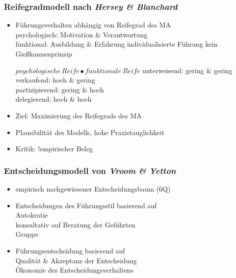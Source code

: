 \documentclass{cheatsheet}
\begin{document}
    \begin{normbox}{\subsubsection{Reifegradmodell nach \emph{Hersey \& Blanchard}}}
        \begin{itemize}
            \item Führungsverhalten abhängig von Reifegrad des MA\\
            \ra psychologisch: Motivation \& Verantwortung\\
            \ra funktional: Ausbildung \& Erfahrung
            \ra individualisierte Führung \ra kein Gießkannenprinzip
            \begin{hintbox}{$psychologische \ Reife \bullet funktionale \ Reife$}
                \ra unterweisend: gering \& gering\\
                \ra verkaufend: hoch \& gering\\
                \ra partizipierend: gering \& hoch\\
                \ra delegierend: hoch \& hoch
            \end{hintbox}
            \item Ziel: Maximierung des Reifegrads des MA
            \item Plausibilität des Modells, hohe Praxistauglichkeit 
            \item Kritik: !empirischer Beleg
        \end{itemize}
    \end{normbox}
    \begin{normbox}{\subsubsection{Entscheidungsmodell von \emph{Vroom \& Yetton}}}
        \begin{itemize}
            \item empirisch nachgewiesener Entscheidungsbaum (6Q)
            \item Entscheidungen des Führungsstil basierend auf\\
            \ra Autokratie\\
            \ra konsultativ auf Beratung der Geführten\\
            \ra Gruppe
            \item Führungsentscheidung basierend auf\\
            \ra Qualität \& Akzeptanz der Entscheidung\\
            \ra Ökonomie des Entscheidungsverhaltens
        \end{itemize}
    \end{normbox}
\end{document}
